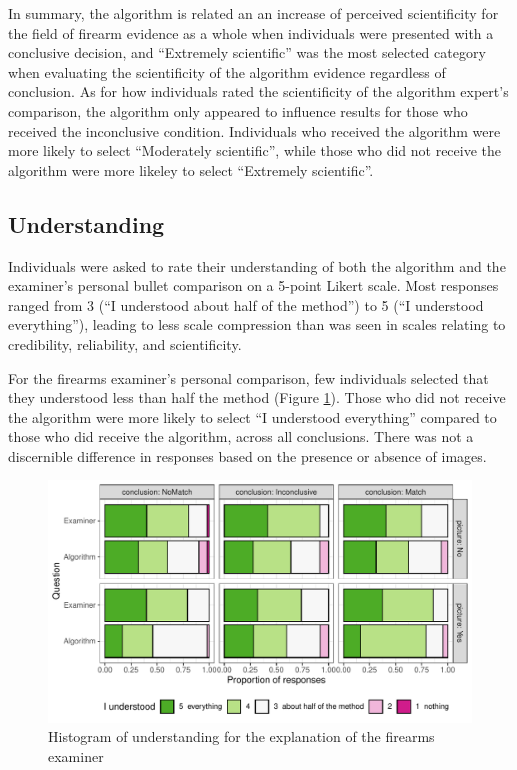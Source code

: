 \documentclass[print]{nuthesis}
\begin{document}
In summary, the algorithm is related an an increase of perceived scientificity for the field of firearm evidence as a whole when individuals were presented with a conclusive decision, and ``Extremely scientific'' was the most selected category when evaluating the scientificity of the algorithm evidence regardless of conclusion.
As for how individuals rated the scientificity of the algorithm expert's comparison, the algorithm only appeared to influence results for those who received the inconclusive condition.
Individuals who received the algorithm were more likely to select ``Moderately scientific'', while those who did not receive the algorithm were more likeley to select ``Extremely scientific''.

\hypertarget{understanding}{%
\subsection{Understanding}\label{understanding}}

Individuals were asked to rate their understanding of both the algorithm and the examiner's personal bullet comparison on a 5-point Likert scale. Most responses ranged from 3 (``I understood about half of the method'') to 5 (``I understood everything''), leading to less scale compression than was seen in scales relating to credibility, reliability, and scientificity.

For the firearms examiner's personal comparison, few individuals selected that they understood less than half the method (Figure \ref{fig:expunder}).
Those who did not receive the algorithm were more likely to select ``I understood everything'' compared to those who did receive the algorithm, across all conclusions.
There was not a discernible difference in responses based on the presence or absence of images.

\begin{figure}

{\centering \includegraphics[width=\linewidth]{thesis_files/figure-latex/expunder-1} 

}

\caption{Histogram of understanding for the explanation of the firearms examiner}\label{fig:expunder}
\end{figure}
\end{document}
